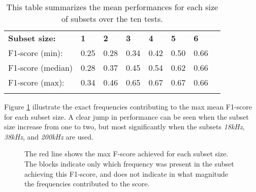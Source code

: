 \begin{longtable}{llllllll}
\caption[Summary exhaustive search]{This table summarizes the mean performances for each size of subsets over the ten tests. }\\
                  &      &      &      &      &      &      &  \\ \hline
\endfirsthead
%
\endhead
%
\hline
\endfoot
%
\endlastfoot
%
\textbf{Subset size:}      & \textbf{1}    & \textbf{2}    & \textbf{3}    & \textbf{4}    & \textbf{5}    & \textbf{6}    &  \\ \hline
F1-score (min):   & 0.25 & 0.28 & 0.34 & 0.42 & 0.50 & 0.66 &  \\
F1-score (median) & 0.28 & 0.37 & 0.45 & 0.54 & 0.62 & 0.66 &  \\
F1-score (max):   & 0.34 & 0.46 & 0.65 & 0.67 & 0.67 & 0.66 &  \\ \hline
\label{summary_per_subset_size_table}

\end{longtable}

Figure \ref{increasing_freq_f1_score_fig} illustrate the exact frequencies contributing to the max mean F1-score for each subset size. A clear jump in performance can be seen when the subset size increase from one to two, but most significantly when the subsets \textit{18kHz}, \textit{38kHz}, and \textit{200kHz} are used.

        \begin{figure}[H]  
            \centering
            
            \caption[Best frequency combination - F1-score]{The red line shows the max F-score achieved for each subset size. The blocks indicate only which frequency was present in the subset achieving this F1-score, and does not indicate in what magnitude the frequencies contributed to the score.}
          	\medskip 
            \label{increasing_freq_f1_score_fig}
        \end{figure}

